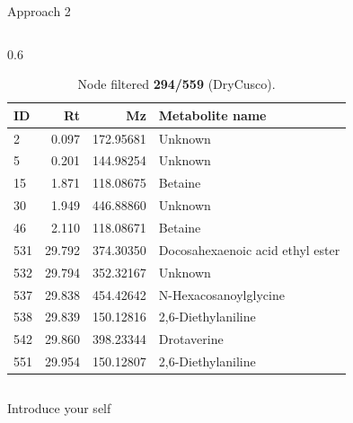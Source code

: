 \documentclass[aspectratio=169]{beamer}
\newcommand{\source}[1]{\par\tiny Source: #1} %
\begin{document}
\begin{frame}{Approach 2}
\begin{columns}[t]
            \begin{column}{0.6\textwidth}
                \begin{table}[htp!]
                    \scriptsize
                    \centering
                    \caption{Node filtered \textbf{294/559} (DryCusco).}
                    \begin{tabular}{lrrl}\toprule
                        ID & Rt & Mz & Metabolite name \\\midrule
                        2	& 0.097	& 172.95681 & Unknown \\
                        5	& 0.201	& 144.98254 & Unknown \\
                        15	& 1.871	& 118.08675 & Betaine \\
                        30	& 1.949	& 446.88860 & Unknown \\
                        46 &	2.110	& 118.08671	& Betaine \\
                        531	& 29.792	& 374.30350 & Docosahexaenoic acid ethyl ester \\
                        532	& 29.794	& 352.32167 & Unknown \\
                        537	& 29.838	& 454.42642 & N-Hexacosanoylglycine \\
                        538	& 29.839	& 150.12816 & 2,6-Diethylaniline \\
                        542	& 29.860	& 398.23344 & Drotaverine \\
                        551	& 29.954	& 150.12807 & 2,6-Diethylaniline \\\bottomrule
                    \end{tabular}
                \end{table}
            \end{column}
        \end{columns}

        \begin{note}
            {Introduce your self}
        \end{note}
    \end{frame}

\end{document}

